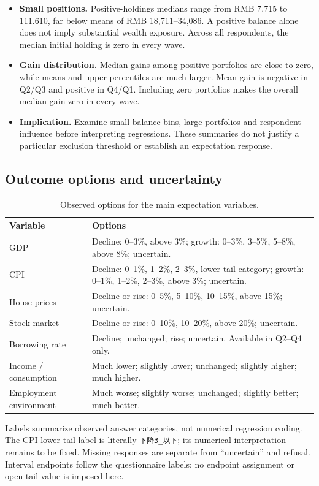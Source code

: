 \documentclass[11pt,letterpaper,english,final]{article}
\begin{document}
\begin{itemize}[nosep]
\item \textbf{Small positions.} Positive-holdings medians range from RMB 7.715 to 111.610, far below means of RMB 18,711--34,086. A positive balance alone does not imply substantial wealth exposure. Across all respondents, the median initial holding is zero in every wave.
\item \textbf{Gain distribution.} Median gains among positive portfolios are close to zero, while means and upper percentiles are much larger. Mean gain is negative in Q2/Q3 and positive in Q4/Q1. Including zero portfolios makes the overall median gain zero in every wave.
\item \textbf{Implication.} Examine small-balance bins, large portfolios and respondent influence before interpreting regressions. These summaries do not justify a particular exclusion threshold or establish an expectation response.
\end{itemize}

\clearpage
\subsection{Outcome options and uncertainty}
\begin{table}[H]
\centering\small
\setlength{\tabcolsep}{5pt}
\caption{Observed options for the main expectation variables.}
\begin{tabular}{>{\raggedright\arraybackslash}p{.23\linewidth}p{.70\linewidth}}
\toprule
Variable & Options \\
\midrule
GDP & Decline: 0--3\%, above 3\%; growth: 0--3\%, 3--5\%, 5--8\%, above 8\%; uncertain. \\[3pt]
CPI & Decline: 0--1\%, 1--2\%, 2--3\%, lower-tail category; growth: 0--1\%, 1--2\%, 2--3\%, above 3\%; uncertain. \\[3pt]
House prices & Decline or rise: 0--5\%, 5--10\%, 10--15\%, above 15\%; uncertain. \\[3pt]
Stock market & Decline or rise: 0--10\%, 10--20\%, above 20\%; uncertain. \\[3pt]
Borrowing rate & Decline; unchanged; rise; uncertain. Available in Q2--Q4 only. \\[3pt]
Income / consumption & Much lower; slightly lower; unchanged; slightly higher; much higher. \\[3pt]
Employment environment & Much worse; slightly worse; unchanged; slightly better; much better. \\
\bottomrule
\end{tabular}
\par\vspace{4pt}\begin{minipage}{\linewidth}\footnotesize Labels summarize observed answer categories, not numerical regression coding. The CPI lower-tail label is literally \texttt{下降3\_以下}; its numerical interpretation remains to be fixed. Missing responses are separate from ``uncertain'' and refusal. Interval endpoints follow the questionnaire labels; no endpoint assignment or open-tail value is imposed here.\end{minipage}
\end{table}
\end{document}
